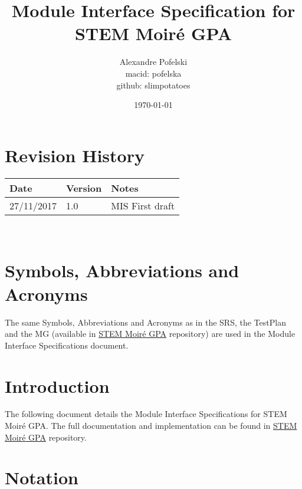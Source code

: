 \documentclass[12pt, titlepage]{article}
\newcommand{\progname}{STEM Moir{\'e} GPA}
\begin{document}
\title{Module Interface Specification for \progname{}}

\author{Alexandre Pofelski \\
		macid: pofelska \\
		github: slimpotatoes}

\date{\today}

\maketitle


\section{Revision History}

\begin{tabularx}{\textwidth}{p{3cm}p{2cm}X}
\toprule {\bf Date} & {\bf Version} & {\bf Notes}\\
\midrule
27/11/2017 & 1.0 & MIS First draft \\
\bottomrule
\end{tabularx}

~\newpage

\section{Symbols, Abbreviations and Acronyms}

The same Symbols, Abbreviations and Acronyms as in the SRS, the TestPlan and the MG (available in \href{https://github.com/slimpotatoes/STEM_Moire_GPA}{\progname{}} repository) are used in the Module Interface Specifications document. 

\newpage

\tableofcontents

\newpage


\section{Introduction}

The following document details the Module Interface Specifications for \progname{}. The full documentation and implementation can be found in \href{https://github.com/slimpotatoes/STEM_Moire_GPA}{\progname{}} repository.

\section{Notation}
\end{document}
